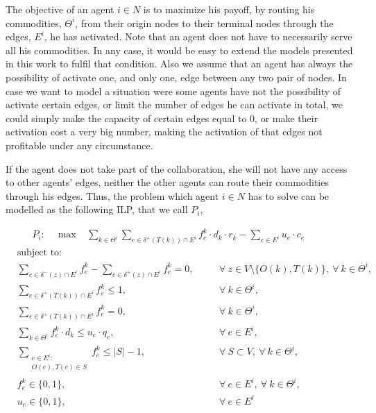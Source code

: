 \documentclass{article}
\begin{document}
The objective of an agent $i \in N$ is to maximize his payoff, by routing his
commodities, $\Theta^i$, from their origin nodes to their terminal nodes through the edges, $E^i$, he has activated. Note that an agent does not have to necessarily serve all his commodities. In any case, it would be easy to extend the models presented in this work to fulfil that condition. Also we assume that an agent has always the possibility of activate one, and only one, edge between any two pair of nodes. In case we want to model a situation were some agents have not the possibility of activate certain edges, or limit the number of edges he can activate in total, we could simply make the capacity of certain edges equal to 0, or make their activation cost a very big number, making the activation of that edges not profitable under any circumstance. 

If the agent does not take part of the collaboration, she will not have any access to other agents' edges, neither the other agents can route their commodities through his edges. Thus, the problem which agent $i\in N$ has to solve can be modelled as the following ILP, that we call $P_i$,

    \begin{align}
        &  P_i: \quad \max  &  \sum_{k\in \Theta^i} \sum_{e \in \delta^+(T(k))\cap E^i} f_e^k \cdot d_k \cdot r_k - \sum_{e\in E^i} u_e\cdot c_e \hspace{20pt} &&   \label{eq:SingleAgentA}
    \end{align}
    \begin{align}
        & \text{subject to:}       &  \nonumber\\
       & \sum_{e \in \delta^-(z)\cap E^i} f_e^k-\sum_{e \in \delta^+(z)\cap E^i} f_e^k = 0,\quad && \forall\ z\in V\setminus\{O(k),T(k)\},\ \forall\ k\in\Theta^i,  \label{eq:SingleAgentB}\\
        &    \sum_{e \in \delta^+(T(k))\cap E^i} f_e^k \leq 1,  && \forall\ k\in \Theta^i, \label{eq:SingleAgentC} \\
		& \sum_{e \in \delta^+(T(k))\cap E^i} f_e^k= 0,  && \forall\ k\in \Theta^i, \label{eq:SingleAgentD} \\
		& \sum_{k \in \Theta^i} f_e^k \cdot d_k \leq u_e\cdot q_e, && \forall\ e \in E^i,\label{eq:SingleAgentE}  \\
		& \sum_{\substack{e \in E^i\colon \\ O(e),T(e) \in S}} f_e^k \leq |S| -1,   && \forall\ S \subset V,\ \forall\ k \in \Theta^i, \label{eq:SingleAgentF}\\[1em]
		& f_e^k \in \{0,1\},    && \forall\ e \in E^i,\ \forall\ k \in \Theta^i, \label{eq:SingleAgentG} \\ 
		&  u_e   \in \{0,1\},           && \forall\ e \in E^i 
    \end{align}
\end{document}
